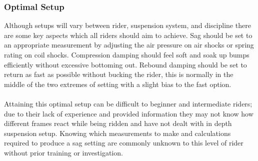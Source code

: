 	\subsubsection{Optimal Setup}
		Although setups will vary between rider, suspension system, and discipline there are some key aspects which all riders should aim to achieve. Sag should be set to an appropriate measurement by adjusting the air pressure on air \glspl{shock} or spring rating on coil \glspl{shock}. Compression damping should feel soft and soak up bumps efficiently without excessive bottoming out. Rebound damping should be set to return as fast as possible without bucking the rider, this is normally in the middle of the two extremes of setting with a slight bias to the fast option.
		\\\\
		Attaining this optimal setup can be difficult to beginner and intermediate riders; due to their lack of experience and provided information they may not know how different frames react while being ridden and have not dealt with in depth suspension setup. Knowing which measurements to make and calculations required to produce a sag setting are commonly unknown to this level of rider without prior training or investigation.